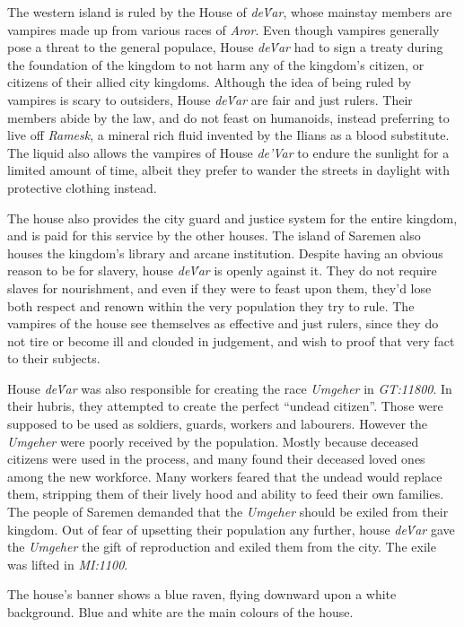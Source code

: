 The western island is ruled by the House of \emph{de\'Var}, whose mainstay
members are vampires made up from various races of \emph{Aror}. Even though
vampires generally pose a threat to the general populace, House \emph{de\'Var}
had to sign a treaty during the foundation of the kingdom to not harm any of
the kingdom's citizen, or citizens of their allied city kingdoms. Although
the idea of being ruled by vampires is scary to outsiders, House \emph{de\'Var}
are fair and just rulers. Their members abide by the law, and do not feast on
humanoids, instead preferring to live off \emph{Ramesk}, a mineral rich fluid
invented by the Ilians as a blood substitute. The liquid also allows the
vampires of House \emph{de'Var} to endure the sunlight for a limited amount of
time, albeit they prefer to wander the streets in daylight with protective
clothing instead.

The house also provides the city guard and justice system for the entire
kingdom, and is paid for this service by the other houses. The island of
Saremen also houses the kingdom's library and arcane institution. Despite
having an obvious reason to be for slavery, house \emph{de\'Var} is openly
against it. They do not require slaves for nourishment, and even if they were
to feast upon them, they'd lose both respect and renown within the very
population they try to rule. The vampires of the house see themselves as
effective and just rulers, since they do not tire or become ill and clouded in
judgement, and wish to proof that very fact to their subjects.

House \emph{de\'Var} was also responsible for creating the race \emph{Umgeher}
in \emph{GT:11800}. In their hubris, they attempted to create the perfect
``undead citizen''. Those were supposed to be used as soldiers, guards,
workers and labourers. However the \emph{Umgeher} were poorly received by the
population. Mostly because deceased citizens were used in the process, and
many found their deceased loved ones among the new workforce. Many workers
feared that the undead would replace them, stripping them of their lively hood
and ability to feed their own families. The people of Saremen demanded that
the \emph{Umgeher} should be exiled from their kingdom. Out of fear of
upsetting their population any further, house \emph{de\'Var} gave the
\emph{Umgeher} the gift of reproduction and exiled them from the city. The
exile was lifted in \emph{MI:1100}.

The house's banner shows a blue raven, flying downward upon a white
background.  Blue and white are the main colours of the house.

